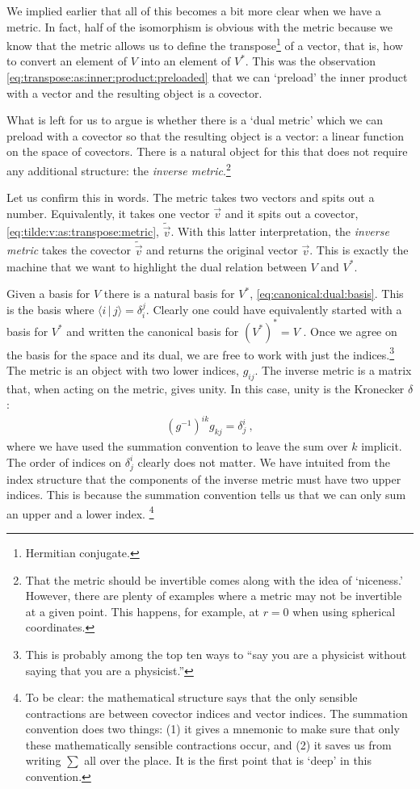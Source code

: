 \documentclass[
  11pt,
	colorful,
	raggedright,
]{tufte-style-thesis-flip}
\begin{document}
We implied earlier that all of this becomes a bit more clear when we have a metric. In fact, half of the isomorphism is obvious with the metric because we know that the metric allows us to define the transpose\footnote{Hermitian conjugate.} of a vector, that is, how to convert an element of $V$ into an element of $V^*$. This was the observation \eqref{eq:transpose:as:inner:product:preloaded} that we can `preload' the inner product with a vector and the resulting object is a covector.

What is left for us to argue is whether there is a `dual metric' which we can preload with a covector so that the resulting object is a vector: a linear function on the space of covectors. There is a natural object for this that does not require any additional structure: the \emph{inverse metric}.\footnote{That the metric should be invertible comes along with the idea of `niceness.' However, there are plenty of examples where a metric may not be invertible at a given point. This happens, for example, at $r=0$ when using spherical coordinates.} 

Let us confirm this in words. The metric takes two vectors and spits out a number. Equivalently, it takes one vector $\vec{v}$ and it spits out a covector, \eqref{eq:tilde:v:as:transpose:metric}, $\tilde{\vec{v}}$. With this latter interpretation, the \emph{inverse metric} takes the covector $\tilde{\vec{v}}$ and returns the original vector $\vec{v}$. This is exactly the machine that we want to highlight the dual relation between $V$ and $V^*$. 

Given a basis for $V$ there is a natural basis for $V^*$, \eqref{eq:canonical:dual:basis}. This is the basis where $\langle i\, | \,j \rangle = \delta_i^j$. Clearly one could have equivalently started with a basis for $V^*$ and written the canonical basis for $(V^*)^* = V$ . Once we agree on the basis for the space and its dual, we are free to work with just the indices.\footnote{This is probably among the top ten ways to ``say you are a physicist without saying that you are a physicist.''} The metric is an object with two lower indices, $g_{ij}$. The inverse metric is a matrix that, when acting on the metric, gives unity. In this case, unity is the Kronecker $\delta$:
\begin{align}
  \left(g^{-1}\right)^{ik}g_{kj} = \delta^i_j  \ ,
\end{align}
where we have used the summation convention to leave the sum over $k$ implicit. The order of indices on $\delta^i_j$ clearly does not matter. We have intuited from the index structure that the components of the inverse metric must have two upper indices. This is because the summation convention tells us that we can only sum an upper and a lower index.%
\footnote{To be clear: the mathematical structure says that the only sensible contractions are between covector indices and vector indices. The summation convention does two things: (1) it gives a mnemonic to make sure that only these mathematically sensible contractions occur, and (2) it saves us from writing $\sum$ all over the place. It is the first point that is `deep' in this convention.} %
\end{document}
